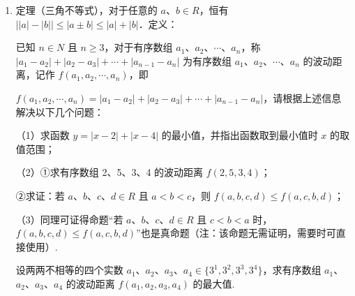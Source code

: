 \documentclass[a4paper,11pt]{article}
\begin{document}
\begin{enumerate}
\item 定理（三角不等式），对于任意的 $a$、$b\in R$，恒有 $\lvert\lvert a\rvert-\lvert b\rvert\rvert\leqslant\lvert a\pm b\rvert\leqslant\lvert a\rvert+\lvert b\rvert$．定义：

已知 $n\in N$ 且 $n\geqslant3$，对于有序数组 $a_1$、$a_2$、$\cdots$、$a_n$，称 $\lvert a_1-a_2\rvert+\lvert a_2-a_3\rvert+\cdots+\lvert a_{n-1}-a_n\rvert$ 为有序数组 $a_1$、$a_2$、$\cdots$、$a_n$ 的波动距离，记作 $f(a_1,a_2,\cdots,a_n)$，即

$f(a_1,a_2,\cdots,a_n)=\lvert a_1-a_2\rvert+\lvert a_2-a_3\rvert+\cdots+\lvert a_{n-1}-a_n\rvert$，请根据上述信息解决以下几个问题：

（1）求函数 $y=\lvert x-2\rvert+\lvert x-4\rvert$ 的最小值，并指出函数取到最小值时 $x$ 的取值范围；

（2）①求有序数组 2、5、3、4 的波动距离 $f(2,5,3,4)$；

②求证：若 $a$、$b$、$c$、$d\in R$ 且 $a<b<c$，则 $f(a,b,c,d)\leqslant f(a,c,b,d)$；

（3）同理可证得命题“若 $a$、$b$、$c$、$d\in R$ 且 $c<b<a$ 时，$f(a,b,c,d)\leqslant f(a,c,b,d)$”也是真命题（注：该命题无需证明，需要时可直接使用）.

设两两不相等的四个实数 $a_1$、$a_2$、$a_3$、$a_4\in\{3^1,3^2,3^3,3^4\}$，求有序数组 $a_1$、$a_2$、$a_3$、$a_4$ 的波动距离 $f(a_1,a_2,a_3,a_4)$ 的最大值.

\ansspace*[14]


\end{enumerate}
\end{document}
